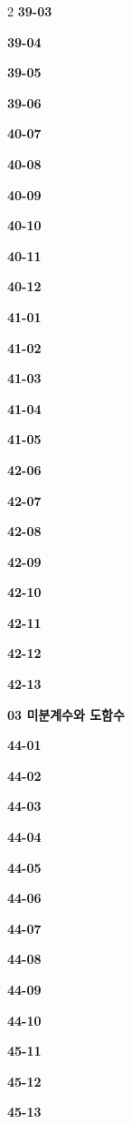 \documentclass[10pt,a4paper]{article}
\begin{document}
\begin{multicols}{2}
\noindent\textbf{39-03}\ \par
\noindent\textbf{39-04}\ \par
\noindent\textbf{39-05}\ \par
\noindent\textbf{39-06}\ \par
\noindent\textbf{40-07}\ \par
\noindent\textbf{40-08}\ \par
\noindent\textbf{40-09}\ \par
\noindent\textbf{40-10}\ \par
\noindent\textbf{40-11}\ \par
\noindent\textbf{40-12}\ \par
\noindent\textbf{41-01}\ \par
\noindent\textbf{41-02}\ \par
\noindent\textbf{41-03}\ \par
\noindent\textbf{41-04}\ \par
\noindent\textbf{41-05}\ \par
\noindent\textbf{42-06}\ \par
\noindent\textbf{42-07}\ \par
\noindent\textbf{42-08}\ \par
\noindent\textbf{42-09}\ \par
\noindent\textbf{42-10}\ \par
\noindent\textbf{42-11}\ \par
\noindent\textbf{42-12}\ \par
\noindent\textbf{42-13}\ \par
\noindent\textbf{03 미분계수와 도함수}\par\smallskip
\noindent\textbf{44-01}\ \par
\noindent\textbf{44-02}\ \par
\noindent\textbf{44-03}\ \par
\noindent\textbf{44-04}\ \par
\noindent\textbf{44-05}\ \par
\noindent\textbf{44-06}\ \par
\noindent\textbf{44-07}\ \par
\noindent\textbf{44-08}\ \par
\noindent\textbf{44-09}\ \par
\noindent\textbf{44-10}\ \par
\noindent\textbf{45-11}\ \par
\noindent\textbf{45-12}\ \par
\noindent\textbf{45-13}\ \par

\end{multicols}
\end{document}
